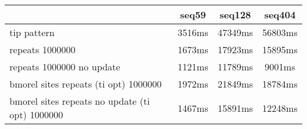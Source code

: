 \begin{tabular}{|l|c|c|c|}
\hline
 & seq59 & seq128 & seq404  \\
\hline
tip pattern &  3516ms &  47349ms &  56803ms\\
\hline
repeats 1000000 &  1673ms &  17923ms &  15895ms\\
\hline
repeats 1000000 no update &  1121ms &  11789ms &  9001ms\\
\hline
bmorel sites repeats (ti opt) 1000000 &  1972ms &  21849ms &  18784ms\\
\hline
bmorel sites repeats no update (ti opt) 1000000 &  1467ms &  15891ms &  12248ms\\
\hline
\end{tabular}
